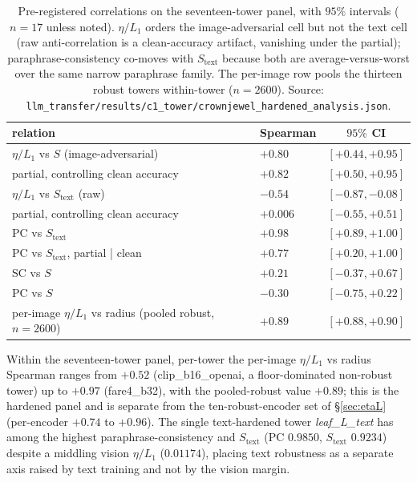 \begin{table}[t]\centering
\caption{Pre-registered correlations on the seventeen-tower panel, with
$95\%$ intervals ($n{=}17$ unless noted). $\eta/L_1$ orders the image-adversarial
cell but not the text cell (raw anti-correlation is a clean-accuracy artifact,
vanishing under the partial); paraphrase-consistency co-moves with $S_{\text{text}}$
because both are average-versus-worst over the same narrow paraphrase family. The
per-image row pools the thirteen robust towers within-tower ($n{=}2600$). Source:
\texttt{llm\_transfer/results/c1\_tower/crownjewel\_hardened\_analysis.json}.}
\label{tab:crown-corr}
\small
\begin{tabular}{llc}
\toprule
relation & Spearman & $95\%$ CI \\
\midrule
$\eta/L_1$ vs $S$ (image-adversarial)          & $+0.80$ & $[+0.44,+0.95]$ \\
\quad partial, controlling clean accuracy       & $+0.82$ & $[+0.50,+0.95]$ \\
$\eta/L_1$ vs $S_{\text{text}}$ (raw)           & $-0.54$ & $[-0.87,-0.08]$ \\
\quad partial, controlling clean accuracy       & $+0.006$ & $[-0.55,+0.51]$ \\
PC vs $S_{\text{text}}$                         & $+0.98$ & $[+0.89,+1.00]$ \\
\quad PC vs $S_{\text{text}}$, partial | clean  & $+0.77$ & $[+0.20,+1.00]$ \\
SC vs $S$                                        & $+0.21$ & $[-0.37,+0.67]$ \\
PC vs $S$                                        & $-0.30$ & $[-0.75,+0.22]$ \\
per-image $\eta/L_1$ vs radius (pooled robust, $n{=}2600$) & $+0.89$ & $[+0.88,+0.90]$ \\
\bottomrule
\end{tabular}
\end{table}

Within the seventeen-tower panel, per-tower the per-image $\eta/L_1$ vs radius
Spearman ranges from $+0.52$ (clip\_b16\_openai, a floor-dominated non-robust
tower) up to $+0.97$ (fare4\_b32), with the pooled-robust value $+0.89$; this is
the hardened panel and is separate from the ten-robust-encoder set of
\S\ref{sec:etaL} (per-encoder $+0.74$ to $+0.96$). The single text-hardened tower
\emph{leaf\_L\_text} has
among the highest paraphrase-consistency and $S_{\text{text}}$ (PC $0.9850$,
$S_{\text{text}}$ $0.9234$) despite a middling vision $\eta/L_1$ ($0.01174$),
placing text robustness as a separate axis raised by text training and not by the
vision margin.

